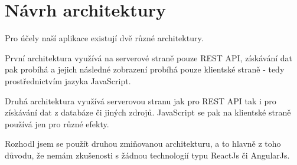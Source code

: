 \section{Návrh architektury}
Pro účely naší aplikace existují dvě různé architektury.

První architektura využívá na serverové straně pouze REST API, získávání dat pak probíhá a jejich následné zobrazení probíhá pouze klientské straně - tedy prostřednictvím jazyka JavaScript.

Druhá architektura využívá serverovou stranu jak pro REST API tak i pro získávání dat z databáze či jiných zdrojů. JavaScript se pak na klientské straně používá jen pro různé efekty.

Rozhodl jsem se použít druhou zmiňovanou architekturu, a to hlavně z toho důvodu, že nemám zkušenosti s žádnou technologií typu ReactJs či AngularJs.